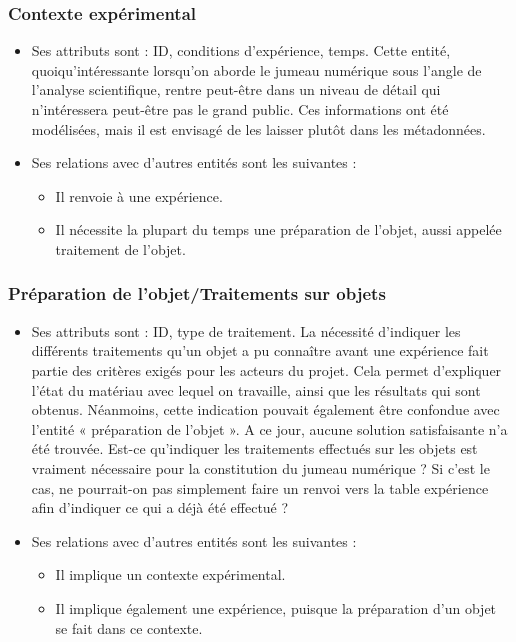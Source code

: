 \subsubsection{Contexte expérimental}
\begin{itemize}
    \item Ses attributs sont : ID, conditions d'expérience, temps. Cette entité, quoiqu’intéressante lorsqu’on aborde le jumeau numérique sous l’angle de l’analyse scientifique, rentre peut-être dans un niveau de détail qui n’intéressera peut-être pas le grand public. Ces informations ont été modélisées, mais il est envisagé de les laisser plutôt dans les métadonnées.
    \item Ses relations avec d’autres entités sont les suivantes : 
    \begin{itemize}
        \item Il renvoie à une expérience.
        \item Il nécessite la plupart du temps une préparation de l’objet, aussi appelée traitement de l’objet.
    \end{itemize}
\end{itemize}
\subsubsection{Préparation de l’objet/Traitements sur objets}
\begin{itemize}
    \item Ses attributs sont : ID, type de traitement. La nécessité d’indiquer les différents traitements qu’un objet a pu connaître avant une expérience fait partie des critères exigés pour les acteurs du projet. Cela permet d’expliquer l’état du matériau avec lequel on travaille, ainsi que les résultats qui sont obtenus. Néanmoins, cette indication pouvait également être confondue avec l’entité « préparation de l’objet ». A ce jour, aucune solution satisfaisante n’a été trouvée. Est-ce qu’indiquer les traitements effectués sur les objets est vraiment nécessaire pour la constitution du jumeau numérique ? Si c’est le cas, ne pourrait-on pas simplement faire un renvoi vers la table expérience afin d’indiquer ce qui a déjà été effectué ?
    \item Ses relations avec d’autres entités sont les suivantes : 
    \begin{itemize}
        \item Il implique un contexte expérimental.
        \item Il implique également une expérience, puisque la préparation d’un objet se fait dans ce contexte.
    \end{itemize}
\end{itemize}
